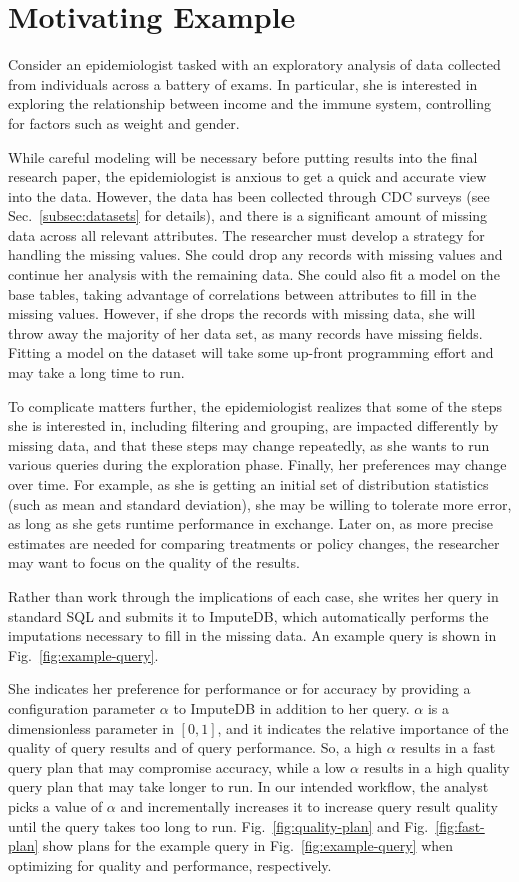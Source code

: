 \section{Motivating Example}
Consider an epidemiologist tasked with an 
exploratory analysis of data collected from individuals across
a battery of exams. In particular, she is interested in exploring
the relationship between income and the immune system,
controlling for factors such as weight and gender.

While careful modeling will be necessary before putting
results into the final research paper, the epidemiologist is anxious
to get a quick and accurate view into the data. However,
the data has been collected through CDC surveys (see Sec.~\ref{subsec:datasets} for details),
and there is a significant amount of missing data across all
relevant attributes. The researcher must develop a strategy
for handling the missing values. She could drop any records with
missing values and continue her analysis with the remaining data.
She could also fit a model on the base tables, taking advantage of correlations between attributes to fill in the missing values.
However, if she drops the records with missing data, she will throw away the majority of her data set, as many records have missing fields.
Fitting a model on the dataset will take some up-front programming effort and may take a long time to run.

To complicate matters further, the epidemiologist realizes that
some of the steps she is interested in, including filtering and grouping,
are impacted differently by missing data, and that these steps may change
repeatedly, as she wants to run various queries during the exploration phase.
Finally, her preferences may change over time. For example, as she is getting an initial
set of distribution statistics (such as mean and standard deviation), she may be willing to tolerate more error, as long as she gets runtime performance in exchange. Later on,
as more precise estimates are needed for comparing treatments or policy changes, the researcher
may want to focus on the quality of the results.

Rather than work through the implications of each case, she writes her query in standard SQL and submits it to ImputeDB, which automatically performs the imputations necessary to fill in the missing data.
An example query is shown in Fig.~\ref{fig:example-query}.

She indicates her preference for performance or for accuracy by providing a configuration parameter $\alpha$ to ImputeDB in addition to her query.
$\alpha$ is a dimensionless parameter in $[0,1]$, and it indicates the relative importance of the quality of query results and of query performance.
So, a high $\alpha$ results in a fast query plan that may compromise accuracy, while a low $\alpha$ results in a high quality query plan that may take longer to run.
In our intended workflow, the analyst picks a value of $\alpha$ and incrementally increases it to increase query result quality until the query takes too long to run.
Fig.~\ref{fig:quality-plan} and Fig.~\ref{fig:fast-plan} show plans for the example query in Fig.~\ref{fig:example-query} when optimizing for quality and performance, respectively.

